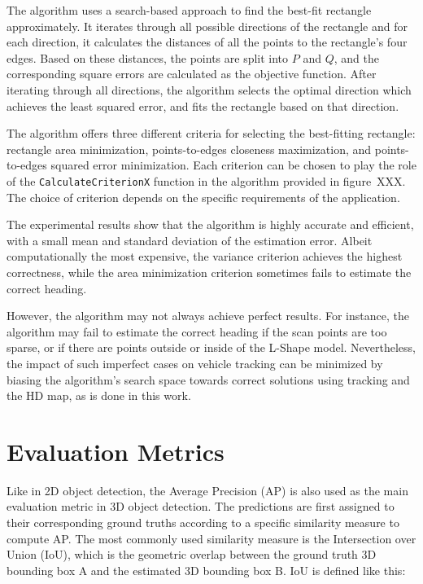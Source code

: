 The algorithm uses a search-based approach to find the best-fit rectangle approximately.
It iterates through all possible directions of the rectangle and for each direction, it calculates the distances of all the points to the rectangle's four edges.
Based on these distances, the points are split into $P$ and $Q$, and the corresponding square errors are calculated as the objective function.
After iterating through all directions, the algorithm selects the optimal direction which achieves the least squared error, and fits the rectangle based on that direction.

The algorithm offers three different criteria for selecting the best-fitting rectangle: rectangle area minimization, points-to-edges closeness maximization, and points-to-edges squared error minimization.
Each criterion can be chosen to play the role of the \texttt{CalculateCriterionX} function in the algorithm provided in figure~XXX. The choice of criterion depends on the specific requirements of the application.

The experimental results show that the algorithm is highly accurate and efficient, with a small mean and standard deviation of the estimation error.
Albeit computationally the most expensive, the variance criterion achieves the highest correctness, while the area minimization criterion sometimes fails to estimate the correct heading.

However, the algorithm may not always achieve perfect results.
For instance, the algorithm may fail to estimate the correct heading if the scan points are too sparse, or if there are points outside or inside of the L-Shape model.
Nevertheless, the impact of such imperfect cases on vehicle tracking can be minimized by biasing the algorithm's search space towards correct solutions using tracking and the HD map, as is done in this work.


\section{Evaluation Metrics}
\label{sec:evalmetrics}

Like in 2D object detection, the Average Precision (AP) is also used as the main evaluation metric in 3D object detection.
The predictions are first assigned to their corresponding ground truths according to a specific similarity measure to compute AP\@.
The most commonly used similarity measure is the Intersection over Union (IoU), which is the geometric overlap between the ground truth 3D bounding box A and the estimated 3D bounding box B\@.
IoU is defined like this:

